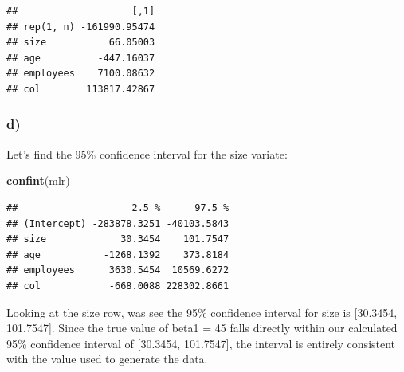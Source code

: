\documentclass[
]{article}
\newenvironment{Shaded}{\begin{snugshade}}{\end{snugshade}}
\newcommand{\FunctionTok}[1]{\textcolor[rgb]{0.13,0.29,0.53}{\textbf{#1}}}
\newcommand{\NormalTok}[1]{#1}
\begin{document}
\begin{verbatim}
##                    [,1]
## rep(1, n) -161990.95474
## size           66.05003
## age          -447.16037
## employees    7100.08632
## col        113817.42867
\end{verbatim}

\subsubsection{d)}\label{d-1}

Let's find the 95\% confidence interval for the size variate:

\begin{Shaded}
\begin{Highlighting}[]
\FunctionTok{confint}\NormalTok{(mlr)}
\end{Highlighting}
\end{Shaded}

\begin{verbatim}
##                    2.5 %      97.5 %
## (Intercept) -283878.3251 -40103.5843
## size             30.3454    101.7547
## age           -1268.1392    373.8184
## employees      3630.5454  10569.6272
## col            -668.0088 228302.8661
\end{verbatim}

Looking at the size row, was see the 95\% confidence interval for size
is {[}30.3454, 101.7547{]}. Since the true value of beta1 = 45 falls
directly within our calculated 95\% confidence interval of {[}30.3454,
101.7547{]}, the interval is entirely consistent with the value used to
generate the data.
\end{document}

